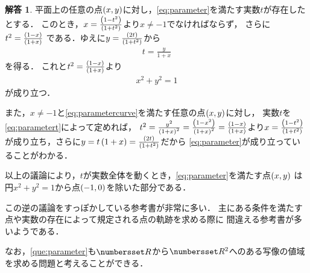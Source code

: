 \documentclass[11pt,a4paper]{ltjsarticle}
\newcommand*{\coord}[1]{\paren{#1}}
\theoremstyle{definition}
\newtheorem{ans}[dfn]{解答}
\begin{document}
\begin{ans} \label{ans:parameter}
  平面上の任意の点$\coord{x, y}$に対し，\cref{eq:parameter}を満たす実数$t$が存在したとする．
  このとき，$x = \frac{\paren*{1 - t^2}}{\paren*{1 + t^2}}$より$x \neq -1$でなければならず，
  さらに$t^2 = \frac{\paren*{1 - x}}{\paren*{1 + x}}$
  である．ゆえに$y = \frac{\paren*{2t}}{\paren*{1 + t^2}}$から
  \begin{align}
    t = \frac{y}{1 + x}
    \label{eq:parametert}
  \end{align}
  を得る．
  これと$t^2 = \frac{\paren*{1 - x}}{\paren*{1 + x}}$より
  \begin{align}
    x^2 + y^2 = 1
    \label{eq:parametercurve}
  \end{align}
  が成り立つ．

  また，$x \neq -1$と\cref{eq:parametercurve}を満たす任意の点$\coord{x, y}$に対し，
  実数$t$を\cref{eq:parametert}によって定めれば，
  $t^2 = \frac{y^2}{\paren*{1 + x}^2} = \frac{\paren*{1 - x^2}}{\paren*{1 + x}^2}
    = \frac{\paren*{1 - x}}{\paren*{1 + x}}$より$x = \frac{\paren*{1 - t^2}}{\paren*{1 + t^2}}$
  が成り立ち，さらに$y = t \paren{1 + x} = \frac{\paren*{2t}}{\paren*{1 + t^2}}$だから
  \cref{eq:parameter}が成り立っていることがわかる．

  以上の議論により，$t$が実数全体を動くとき，\cref{eq:parameter}を満たす点$\coord{x,y}$
  は円$x^2 + y^2 = 1$から点$\coord{-1, 0}$を除いた部分である．
\end{ans}

この逆の議論をすっぽかしている参考書が非常に多い．
主にある条件を満たす点や実数の存在によって規定される点の軌跡を求める際に
間違える参考書が多いようである．

なお，\cref{que:parameter}も$\Real$から$\Real^2$へのある写像の値域を求める問題と考えることができる．
\end{document}
